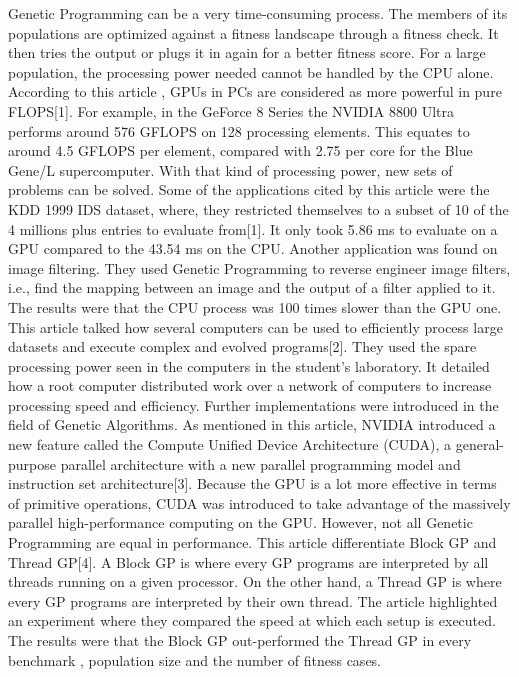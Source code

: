 \documentclass[letterpaper,10pt,titlepage]{article}
\begin{document}
	Genetic Programming can be a very time-consuming process.  The members of its populations are optimized against a fitness landscape through a fitness check.  
	It then tries the output or plugs it in again for a better fitness score. For a large population, the processing power needed cannot be handled by the CPU alone.  
	According to this article , GPUs in PCs are considered as more powerful in pure FLOPS[1].  For example, in the GeForce 8 Series the NVIDIA 8800 Ultra performs around 576 GFLOPS 
	on 128 processing elements.  This equates to around 4.5 GFLOPS per element, compared with 2.75 per core for the Blue Gene/L supercomputer.  With that kind of processing power, 
	new sets of problems can be solved.  Some of the applications cited by this article were the KDD 1999 IDS dataset, where, they restricted themselves to a subset of 10%
	of the 4 millions plus entries to evaluate from[1].  It only took 5.86 ms to evaluate on a GPU compared to the 43.54 ms on the CPU.  Another application was found on image filtering.  
	They used Genetic Programming to reverse engineer image filters, i.e., find the mapping between an image and the output of a filter applied to it.  The results were that the CPU process 
	was 100 times slower than the GPU one.  This article talked how several computers can be used to efficiently process large datasets and execute complex and evolved programs[2].  
	They used the spare processing power seen in the computers in the student's laboratory.  It detailed how a root computer distributed work over a network of computers to increase processing speed and efficiency.
	Further implementations were introduced in the field of Genetic Algorithms.  As mentioned in this article, NVIDIA introduced a new feature called the Compute Unified Device Architecture (CUDA), 
	a general-purpose parallel architecture with a new parallel programming model and instruction set architecture[3].  Because the GPU is a lot more effective in terms of primitive operations, 
	CUDA was introduced to take advantage of the massively parallel high-performance computing on the GPU.  However, not all Genetic Programming are equal in performance.  
	This article  differentiate Block GP and Thread GP[4].  A Block GP is where every GP programs are interpreted by all threads running on a given processor.  
	On the other hand, a Thread GP is where every GP programs are interpreted by their own thread.  The article highlighted an experiment where they compared the speed at which each setup is executed.  
	The results were that the Block GP out-performed the Thread GP in every benchmark , population size and the number of fitness cases.
\end{document}
